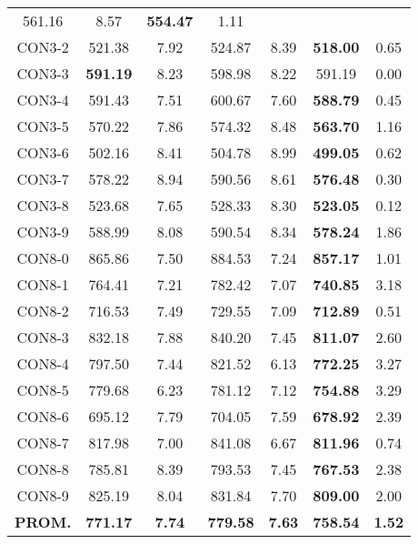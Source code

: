 \begin{table}[ht]
\begin{tabular}{c c c c c c c}
561.16 & 8.57 & \bf{554.47} & 
1.11\\CON3-2 & 521.38 & 7.92 & 
524.87 & 8.39 & \bf{518.00} & 
0.65\\CON3-3 & \bf{591.19} & 8.23 & 
598.98 & 8.22 & 591.19 & 0.00\\
CON3-4 & 591.43 & 7.51 & 
600.67 & 7.60 & \bf{588.79} & 
0.45\\CON3-5 & 570.22 & 7.86 & 
574.32 & 8.48 & \bf{563.70} & 
1.16\\CON3-6 & 502.16 & 8.41 & 
504.78 & 8.99 & \bf{499.05} & 
0.62\\CON3-7 & 578.22 & 8.94 & 
590.56 & 8.61 & \bf{576.48} & 
0.30\\CON3-8 & 523.68 & 7.65 & 
528.33 & 8.30 & \bf{523.05} & 
0.12\\CON3-9 & 588.99 & 8.08 & 
590.54 & 8.34 & \bf{578.24} & 
1.86\\CON8-0 & 865.86 & 7.50 & 
884.53 & 7.24 & \bf{857.17} & 
1.01\\CON8-1 & 764.41 & 7.21 & 
782.42 & 7.07 & \bf{740.85} & 
3.18\\CON8-2 & 716.53 & 7.49 & 
729.55 & 7.09 & \bf{712.89} & 
0.51\\CON8-3 & 832.18 & 7.88 & 
840.20 & 7.45 & \bf{811.07} & 
2.60\\CON8-4 & 797.50 & 7.44 & 
821.52 & 6.13 & \bf{772.25} & 
3.27\\CON8-5 & 779.68 & 6.23 & 
781.12 & 7.12 & \bf{754.88} & 
3.29\\CON8-6 & 695.12 & 7.79 & 
704.05 & 7.59 & \bf{678.92} & 
2.39\\CON8-7 & 817.98 & 7.00 & 
841.08 & 6.67 & \bf{811.96} & 
0.74\\CON8-8 & 785.81 & 8.39 & 
793.53 & 7.45 & \bf{767.53} & 
2.38\\CON8-9 & 825.19 & 8.04 & 
831.84 & 7.70 & \bf{809.00} & 
2.00\\\bf{PROM.} & 
\bf{771.17} & \bf{7.74} & \bf{779.58} & \bf{7.63} & \bf{758.54} & \bf{1.52}\\[1ex]\hline
\end{tabular}
\label{table:nonlin}
\end{table} \clearpage
